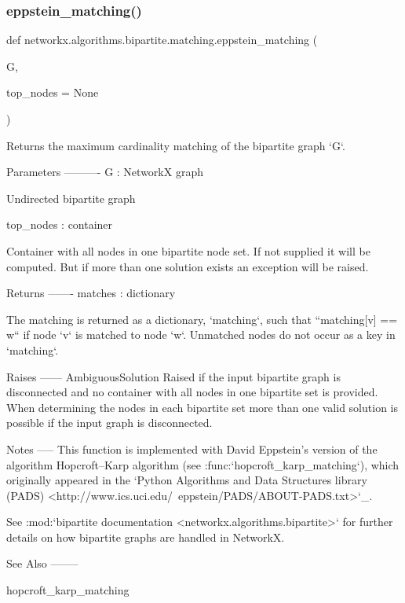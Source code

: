 \subsubsection{\texorpdfstring{eppstein\+\_\+matching()}{eppstein\_matching()}}
{\footnotesize\ttfamily def networkx.\+algorithms.\+bipartite.\+matching.\+eppstein\+\_\+matching (\begin{DoxyParamCaption}\item[{}]{G,  }\item[{}]{top\+\_\+nodes = {\ttfamily None} }\end{DoxyParamCaption})}

\begin{DoxyVerb}Returns the maximum cardinality matching of the bipartite graph `G`.

Parameters
----------
G : NetworkX graph

  Undirected bipartite graph

top_nodes : container

  Container with all nodes in one bipartite node set. If not supplied
  it will be computed. But if more than one solution exists an exception
  will be raised.

Returns
-------
matches : dictionary

  The matching is returned as a dictionary, `matching`, such that
  ``matching[v] == w`` if node `v` is matched to node `w`. Unmatched
  nodes do not occur as a key in `matching`.

Raises
------
AmbiguousSolution
  Raised if the input bipartite graph is disconnected and no container
  with all nodes in one bipartite set is provided. When determining
  the nodes in each bipartite set more than one valid solution is
  possible if the input graph is disconnected.

Notes
-----
This function is implemented with David Eppstein's version of the algorithm
Hopcroft--Karp algorithm (see :func:`hopcroft_karp_matching`), which
originally appeared in the `Python Algorithms and Data Structures library
(PADS) <http://www.ics.uci.edu/~eppstein/PADS/ABOUT-PADS.txt>`_.

See :mod:`bipartite documentation <networkx.algorithms.bipartite>`
for further details on how bipartite graphs are handled in NetworkX.

See Also
--------

hopcroft_karp_matching\end{DoxyVerb}
 \mbox{\label{namespacenetworkx_1_1algorithms_1_1bipartite_1_1matching_a33efdccdbaa981ba4a114541761fb22e}} 
